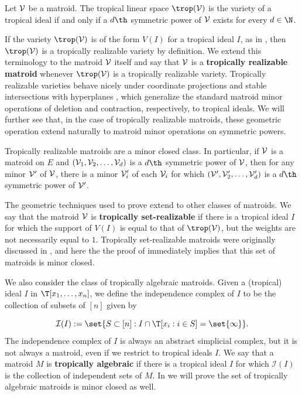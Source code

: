 \begin{theorem}\label{thm:introThm1}
Let $\mathcal{V}$ be a matroid. The tropical linear space $\trop(\sV)$ is the variety of a tropical ideal if and only if a $d\th$ symmetric power of $\mathcal{V}$ exists for every $d\in \N$.
\end{theorem}

If the variety $\trop(\sV)$ is of the form $V(I)$ for a tropical ideal $I$, as in , then $\trop(\sV)$ is a tropically realizable variety by definition. We extend this terminology to the matroid $\mathcal{V}$ itself and say that $\mathcal{V}$ is a \textbf{tropically realizable matroid} whenever $\trop(\sV)$ is a tropically realizable variety. Tropically realizable varieties behave nicely under coordinate projections and stable intersections with hyperplanes \cite{MR20}, which generalize the standard matroid minor operations of deletion and contraction, respectively, to tropical ideals. We will further see that, in the case of tropically realizable matroids, these geometric operation extend naturally to matroid minor operations on symmetric powers.

\begin{theorem}\label{thm:introThm2}
Tropically realizable matroids are a minor closed class. In particular, if $\mathcal{V}$ is a matroid on $E$ and $(\mathcal{V}_1,\mathcal{V}_2,\dots,\mathcal{V}_d)$ is a $d\th$ symmetric power of $\mathcal{V}$, then for any minor $\mathcal{V}'$ of $\mathcal{V}$, there is a minor $\mathcal{V}'_i$ of each $\mathcal{V}_i$ for which $(\mathcal{V}',\mathcal{V}'_2,\dots, \mathcal{V}'_d)$ is a $d\th$ symmetric power of $\mathcal{V}'$.
\end{theorem}

The geometric techniques used to prove  extend to other classes of matroids. We say that the matroid $\mathcal{V}$ is \textbf{tropically set-realizable} if there is a tropical ideal $I$ for which the support of $V(I)$ is equal to that of $\trop(\sV)$, but the weights are not necessarily equal to $1$. Tropically set-realizable matroids were originally discussed in \cite{Yu17}, and here the the proof of  immediately implies that this set of matroids is minor closed. 

We also consider the class of tropically algebraic matroids. Given a (tropical) ideal $I$ in $\T[x_1,\dots,x_n]$, we define the independence complex of $I$ to be the collection of subsets of $[n]$ given by

$$\mathcal{I}(I):= \set{S\subset [n]: I\cap \T[x_i: i\in S]= \set{\infty}}.$$
The independence complex of $I$ is always an abstract simplicial complex, but it is not always a matroid, even if we restrict to tropical ideals $I$. We say that a matroid $M$ is \textbf{tropically algebraic} if there is a tropical ideal $I$ for which $\mathcal{I}(I)$ is the collection of independent sets of $M$. In  we will prove the set of tropically algebraic matroids is minor closed as well. 

